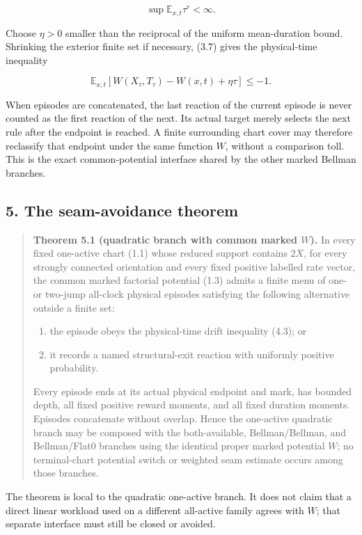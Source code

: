 \[
                         \sup\mathbb E_{x,t}\tau^r<\infty. \tag{4.2}
\]

Choose \(\eta>0\) smaller than the reciprocal of the uniform
mean-duration bound. Shrinking the exterior finite set if necessary,
(3.7) gives the physical-time inequality

\[
 \mathbb E_{x,t}
   [W(X_\tau,T_\tau)-W(x,t)+\eta\tau]\le-1.               \tag{4.3}
\]

When episodes are concatenated, the last reaction of the current episode
is never counted as the first reaction of the next. Its actual target
merely selects the next rule after the endpoint is reached. A finite
surrounding chart cover may therefore reclassify that endpoint under the
same function \(W\), without a comparison toll. This is the exact
common-potential interface shared by the other marked Bellman branches.

\subsection{5. The seam-avoidance
theorem}

\begin{quote}
\textbf{Theorem 5.1 (quadratic branch with common marked \(W\)).} In
every fixed one-active chart (1.1) whose reduced support contains
\(2X\), for every strongly connected orientation and every fixed
positive labelled rate vector, the common marked factorial potential
(1.3) admits a finite menu of one- or two-jump all-clock physical
episodes satisfying the following alternative outside a finite set:

\begin{enumerate}
\def\labelenumi{\arabic{enumi}.}
\tightlist
\item
  the episode obeys the physical-time drift inequality (4.3); or
\item
  it records a named structural-exit reaction with uniformly positive
  probability.
\end{enumerate}

Every episode ends at its actual physical endpoint and mark, has bounded
depth, all fixed positive reward moments, and all fixed duration
moments. Episodes concatenate without overlap. Hence the one-active
quadratic branch may be composed with the both-available,
Bellman/Bellman, and Bellman/Flat0 branches using the identical proper
marked potential \(W\); no terminal-chart potential switch or weighted
seam estimate occurs among those branches.
\end{quote}

The theorem is local to the quadratic one-active branch. It does not
claim that a direct linear workload used on a different all-active
family agrees with \(W\); that separate interface must still be closed
or avoided.

